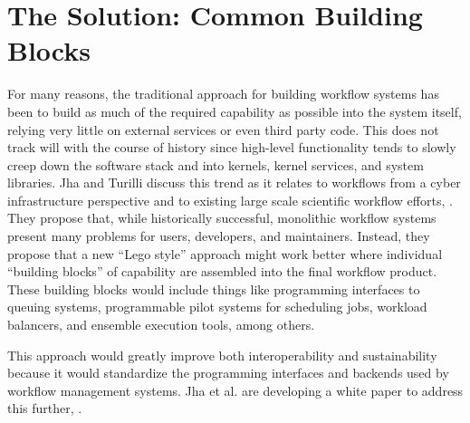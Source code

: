 \section{The Solution: Common Building Blocks}\label{buildings-blocks}

For many reasons, the traditional approach for building workflow systems
has been to build as much of the required capability as possible into
the system itself, relying very little on external services or even
third party code. This does not track will with the course of history
since high-level functionality tends to slowly creep down the
software stack and into kernels, kernel services, and system libraries. Jha and
Turilli discuss this trend as it relates to workflows from a cyber
infrastructure perspective and to existing large scale scientific
workflow efforts, \cite{jha_building_2016}. They propose that, while historically
successful, monolithic workflow systems present many problems for users,
developers, and maintainers. Instead, they propose that a new ``Lego
style'' approach might work better where individual ``building blocks''
of capability are assembled into the final workflow product. These
building blocks would include things like programming interfaces to
queuing systems, programmable pilot systems for scheduling jobs,
workload balancers, and ensemble execution tools, among others.

This approach would greatly improve both interoperability and sustainability
because it would standardize the programming interfaces and backends used by
workflow management systems. Jha et al. are developing a white paper to address
this further, \cite{jha_towards_2016}.
